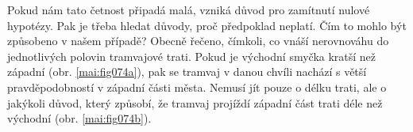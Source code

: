 \begin{mdframed}[style=mdexam]
\begin{example}
    Pokud nám tato četnost připadá malá, vzniká důvod pro zamítnutí nulové hypotézy. Pak je třeba
    hledat důvody, proč předpoklad neplatí. Čím to mohlo být způsobeno v našem případě? Obecně
    řečeno, čímkoli, co vnáší nerovnováhu do jednotlivých polovin tramvajové trati. Pokud je
    východní smyčka kratší než západní (obr. \ref{mai:fig074a}), pak se tramvaj v danou chvíli
    nachází s větší pravděpodobností v západní části města. Nemusí jít pouze o délku trati, ale o
    jakýkoli důvod, který způsobí, že tramvaj projíždí západní část trati déle než východní (obr.
    \ref{mai:fig074b}).
  \end{example}
\end{mdframed}